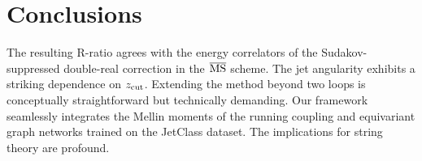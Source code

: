 \section{Conclusions}\label{sec:conclusions}

The resulting R-ratio agrees with the energy correlators of the
Sudakov-suppressed double-real correction in the $\overline{\rm MS}$
scheme. The jet angularity exhibits a striking dependence on $z_{\rm
cut}$. Extending the method beyond two loops is conceptually
straightforward but technically demanding. Our framework seamlessly
integrates the Mellin moments of the running coupling and equivariant
graph networks trained on the JetClass dataset. The implications for
string theory are profound.

